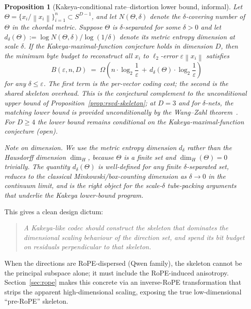 \documentclass[11pt,a4paper]{article}
\theoremstyle{definition}
\theoremstyle{plain}
\newtheorem{proposition}[theorem]{Proposition}
\newcommand{\norm}[1]{\left\lVert#1\right\rVert}
\begin{document}
\begin{proposition}[Kakeya-conditional rate--distortion lower bound, informal]
\label{prop:kakeya-rd}
Let $\Theta = \{x_i / \norm{x_i}\}_{i=1}^n \subset S^{D-1}$, and let $N(\Theta, \delta)$ denote the $\delta$-covering number of $\Theta$ in the chordal metric. Suppose $\Theta$ is $\delta$-separated for some $\delta > 0$ and let $d_\delta(\Theta) := \log N(\Theta, \delta) / \log(1/\delta)$ denote its \emph{metric entropy dimension at scale $\delta$}. If the Kakeya-maximal-function conjecture holds in dimension $D$, then the minimum byte budget to reconstruct all $x_i$ to $\ell_2$-error $\varepsilon\norm{x_i}$ satisfies
\begin{equation}
B(\varepsilon, n, D) \;=\; \Omega\!\left(n \cdot \log_2\!\frac{1}{\varepsilon} \,+\, d_\delta(\Theta) \cdot \log_2\frac{1}{\varepsilon}\right)
\end{equation}
for any $\delta \leq \varepsilon$. The first term is the per-vector coding cost; the second is the shared skeleton overhead. This is the conjectural complement to the \emph{unconditional} upper bound of Proposition~\ref{prop:rsvd-skeleton}; at $D = 3$ and for $\delta$-nets, the matching lower bound is provided unconditionally by the Wang--Zahl theorem~\cite{wang-zahl}. For $D \geq 4$ the lower bound remains conditional on the Kakeya-maximal-function conjecture (open).

\emph{Note on dimension.} We use the metric entropy dimension $d_\delta$ rather than the Hausdorff dimension $\dim_H$, because $\Theta$ is a finite set and $\dim_H(\Theta) = 0$ trivially. The quantity $d_\delta(\Theta)$ is well-defined for any finite $\delta$-separated set, reduces to the classical Minkowski/box-counting dimension as $\delta \to 0$ in the continuum limit, and is the right object for the scale-$\delta$ tube-packing arguments that underlie the Kakeya lower-bound program.
\end{proposition}

This gives a clean design dictum:
\begin{quote}
\emph{A Kakeya-like codec should construct the skeleton that dominates the dimensional scaling behaviour of the direction set, and spend its bit budget on residuals perpendicular to that skeleton.}
\end{quote}
When the directions are RoPE-dispersed (Qwen family), the skeleton cannot be the principal subspace alone; it must include the RoPE-induced anisotropy. Section~\ref{sec:rope} makes this concrete via an inverse-RoPE transformation that strips the apparent high-dimensional scaling, exposing the true low-dimensional ``pre-RoPE'' skeleton.
\end{document}
